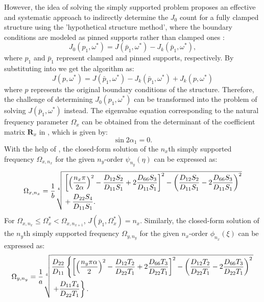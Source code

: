 \documentclass[preprint,12pt]{elsarticle}
\begin{document}
However, the idea of solving the simply supported problem proposes an effective and systematic approach to indirectly determine the \( J_0 \) count for a fully clamped structure using the 'hypothetical structure method', where the boundary conditions are modeled as pinned supports rather than clamped ones \cite{han2018improved}:
%
\begin{equation}\label{eq:J_o_pin}
	J_0(p_1,\omega^*) = J(\bar{p}_1,\omega^*) - J_k(\bar{p}_1,\omega^*),
\end{equation}
%
where \( p_1 \) and \( \bar{p}_1 \) represent clamped and pinned supports, respectively.
By substituting  into  we get the algorithm as:  
%
\begin{equation}\label{eq:new_WWalgorithm}
	J(p,\omega^*) = J(\bar{p}_1,\omega^*) - J_k(\bar{p}_1,\omega^*) + J_k(p,\omega^*)
\end{equation} 
%
where \( p \) represents the original boundary conditions of the structure.
Therefore, the challenge of determining \( J_0(p_1, \omega^*) \) can be transformed into the problem of solving \( J(\bar{p}_1, \omega^*) \) instead. The eigenvalue equation corresponding to the natural frequency parameter \( \Omega_x \) can be obtained from the determinant of the coefficient matrix \( \mathbf{R}_x \) in , which is given by:
%
\begin{equation}\label{eq:SSx} 
	\sin 2\alpha_1 = 0.
\end{equation}
%
With the help of , the closed-form solution of the \(n_x\)th simply supported frequency \(\Omega_{x,n_x}\) for the given \(n_y\)-order \(\psi_{n_y}(\eta)\) can be expressed as:
%
\begin{equation}\label{eq:J_simpx}
	\Omega_{x,n_x} =
	\frac{1}{b} \sqrt[4]{%
		\begin{aligned}
			&\left[\left(\frac{n_x\pi}{2\alpha}\right)^2 - \frac{D_{12}S_2}{D_{11}S_1} + 2 \frac{D_{66}S_3}{D_{11}S_1}\right]^2 - \left(\frac{D_{12}S_2}{D_{11}S_1} - 2 \frac{D_{66}S_3}{D_{11}S_1}\right)^2 \\
			&+ \frac{D_{22}S_4}{D_{11}S_1}.
		\end{aligned}
	}
\end{equation}
%
For \(\Omega_{x,n_x} \leq \Omega_x^* < \Omega_{x,n_{x+1}}\), \(J(\bar{p}_1, \Omega_x^*) = n_x\).
Similarly, the closed-form solution of the \(n_y\)th simply supported frequency \(\Omega_{y,n_y}\) for the given \(n_x\)-order \(\phi_{n_x}(\xi)\) can be expressed as:
%
\begin{equation}\label{eq:J_simpy}
	\Omega_{y,n_y}= 
	\frac{1}{a} \sqrt[4]{%
		\begin{aligned}
			&\frac{D_{22}}{D_{11}}\left\{\left[\left(\frac{n_y\pi\alpha}{2}\right)^2 - \frac{D_{12}T_2}{D_{22}T_1} + 2 \frac{D_{66}T_3}{D_{22}T_1}\right]^2 - \left(\frac{D_{12}T_2}{D_{22}T_1} - 2 \frac{D_{66}T_3}{D_{22}T_1}\right)^2\right. \\
			&\left.  + \frac{D_{11}T_4}{D_{22}T_1}\right\}.
		\end{aligned}
	}
\end{equation}
\end{document}
